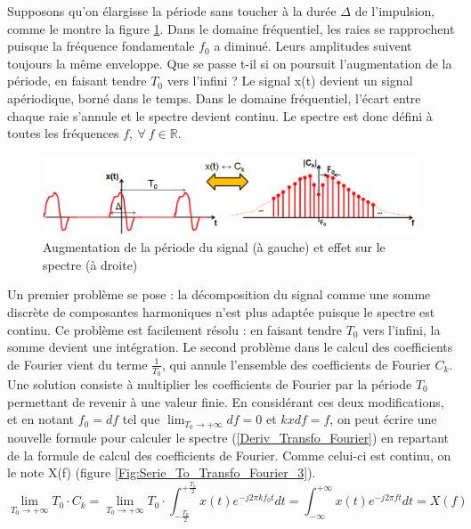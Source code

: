 	Supposons qu'on élargisse la période sans toucher à la durée $\Delta$ de l'impulsion, comme le montre la figure \ref{Fig:Serie_To_Transfo_Fourier_2}. Dans le domaine fréquentiel, les raies se rapprochent puisque la fréquence fondamentale $f_0$ a diminué. Leurs amplitudes suivent toujours la même enveloppe. Que se passe t-il si on poursuit l'augmentation de la période, en faisant tendre $T_0$ vers l'infini ? Le signal x(t) devient un signal apériodique, borné dans le temps. Dans le domaine fréquentiel, l'écart entre chaque raie s'annule et le spectre devient continu. Le spectre est donc défini à toutes les fréquences $f,~\forall~f \in \mathbb{R}$.
	
	\begin{figure}[h!]
		\centering
		\includegraphics[scale=0.5]{images/Serie_To_Transfo_Fourier_2.png}
		\caption{Augmentation de la période du signal (à gauche) et effet sur le spectre (à droite)}	
		\label{Fig:Serie_To_Transfo_Fourier_2} 
	\end{figure}

	Un premier problème se pose : la décomposition du signal comme une somme discrète de composantes harmoniques n'est plus adaptée puisque le spectre est continu. Ce problème est facilement résolu : en faisant tendre $T_0$ vers l'infini, la somme devient une intégration. Le second problème dans le calcul des coefficients de Fourier vient du terme $\frac{1}{T_0}$, qui annule l'ensemble des coefficients de Fourier $C_k$. Une solution consiste à multiplier les coefficients de Fourier par la période $T_0$ permettant de revenir à une valeur finie. 
	En considérant ces deux modifications, et en notant $f_0 = df$ tel que $\lim_{T_0 \to +\infty}df=0$ et $kxdf=f$, on peut écrire une nouvelle formule pour calculer le spectre (\ref{Deriv_Transfo_Fourier}) en repartant de la formule de calcul des coefficients de Fourier. Comme celui-ci est continu, on le note X(f) (figure \ref{Fig:Serie_To_Transfo_Fourier_3}).
	\begin{equation}\label{Deriv_Transfo_Fourier}
	\lim_{T_0 \to +\infty}T_0\cdot C_k=\lim_{T_0 \to +\infty}T_0\cdot \int_{-\frac{T_0}{2}}^{+\frac{T_0}{2}}x(t)e^{-j2\pi kf_0 t}dt=\int_{-\infty}^{+\infty}x(t)e^{-j2\pi f t}dt=X(f)
	\end{equation}
	
